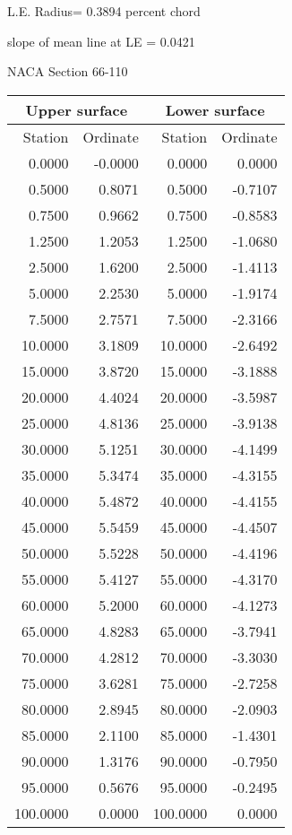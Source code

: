 \documentclass[11pt]{book}
\begin{document}
L.E. Radius=  0.3894 percent chord


 slope of mean line at LE =  0.0421
 \newpage
  \label{s66-110}
 \begin{Large}
 NACA Section 66-110
 \end{Large}
  
 \vspace{8mm}
 \begin{tabular}{|r|r|r|r|} \hline 
 \multicolumn{2}{|c|}{Upper surface} & \multicolumn{2}{|c|}{Lower surface} \\
 \hline
 Station & Ordinate & Station & Ordinate \\
 \hline
0.0000 & -0.0000 & 0.0000 & 0.0000 \\
0.5000 & 0.8071 & 0.5000 & -0.7107 \\
0.7500 & 0.9662 & 0.7500 & -0.8583 \\
1.2500 & 1.2053 & 1.2500 & -1.0680 \\
2.5000 & 1.6200 & 2.5000 & -1.4113 \\
5.0000 & 2.2530 & 5.0000 & -1.9174 \\
7.5000 & 2.7571 & 7.5000 & -2.3166 \\
10.0000 & 3.1809 & 10.0000 & -2.6492 \\
15.0000 & 3.8720 & 15.0000 & -3.1888 \\
20.0000 & 4.4024 & 20.0000 & -3.5987 \\
25.0000 & 4.8136 & 25.0000 & -3.9138 \\
30.0000 & 5.1251 & 30.0000 & -4.1499 \\
35.0000 & 5.3474 & 35.0000 & -4.3155 \\
40.0000 & 5.4872 & 40.0000 & -4.4155 \\
45.0000 & 5.5459 & 45.0000 & -4.4507 \\
50.0000 & 5.5228 & 50.0000 & -4.4196 \\
55.0000 & 5.4127 & 55.0000 & -4.3170 \\
60.0000 & 5.2000 & 60.0000 & -4.1273 \\
65.0000 & 4.8283 & 65.0000 & -3.7941 \\
70.0000 & 4.2812 & 70.0000 & -3.3030 \\
75.0000 & 3.6281 & 75.0000 & -2.7258 \\
80.0000 & 2.8945 & 80.0000 & -2.0903 \\
85.0000 & 2.1100 & 85.0000 & -1.4301 \\
90.0000 & 1.3176 & 90.0000 & -0.7950 \\
95.0000 & 0.5676 & 95.0000 & -0.2495 \\
100.0000 & 0.0000 & 100.0000 & 0.0000 \\
 \hline 
 \end{tabular}
\end{document}
